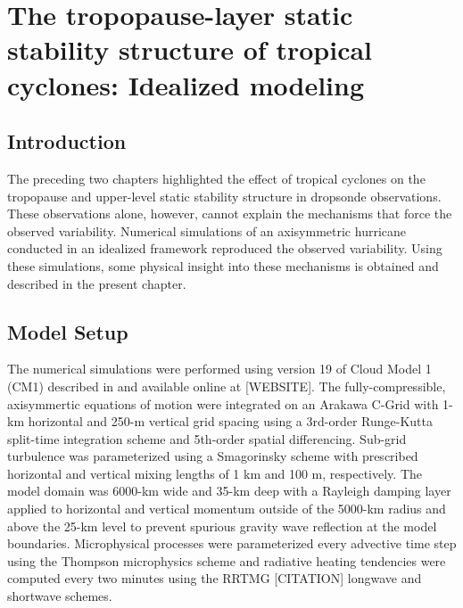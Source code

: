 
\chapter{The tropopause-layer static stability structure of tropical cyclones: Idealized modeling}
\resetfootnote %

\section{Introduction}

The preceding two chapters highlighted the effect of tropical cyclones on the tropopause and upper-level static stability structure in dropsonde observations.
These observations alone, however, cannot explain the mechanisms that force the observed variability.
Numerical simulations of an axisymmetric hurricane conducted in an idealized framework reproduced the observed variability.
Using these simulations, some physical insight into these mechanisms is obtained and described in the present chapter.

\section{Model Setup}

The numerical simulations were performed using version 19 of Cloud Model 1 (CM1) described in \cite{BryanRotunno} and available online at [WEBSITE].
The fully-compressible, axisymmertic equations of motion were integrated on an Arakawa C-Grid with 1-km horizontal and 250-m vertical grid spacing using a 3rd-order Runge-Kutta split-time integration scheme and 5th-order spatial differencing.
Sub-grid turbulence was parameterized using a Smagorinsky scheme with prescribed horizontal and vertical mixing lengths of 1 km and 100 m, respectively.
The model domain was 6000-km wide and 35-km deep with a Rayleigh damping layer applied to horizontal and vertical momentum outside of the 5000-km radius and above the 25-km level to prevent spurious gravity wave reflection at the model boundaries.
Microphysical processes were parameterized every advective time step using the Thompson microphysics scheme \cite{Thompson} and radiative heating tendencies were computed every two minutes using the RRTMG [CITATION] longwave and shortwave schemes. 
 

